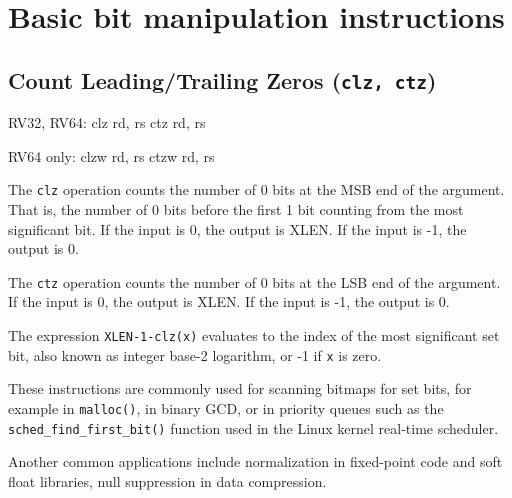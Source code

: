 
\section{Basic bit manipulation instructions}


\subsection{Count Leading/Trailing Zeros (\texttt{clz, ctz})}

\begin{rvb}
  RV32, RV64:
    clz rd, rs
    ctz rd, rs

  RV64 only:
    clzw rd, rs
    ctzw rd, rs
\end{rvb}

The {\tt clz} operation counts the number of 0 bits at the MSB end of the
argument.  That is, the number of 0 bits before the first 1 bit counting from
the most significant bit. If the input is 0, the output is XLEN. If the input
is -1, the output is 0.

The {\tt ctz} operation counts the number of 0 bits at the LSB end of the
argument. If the input is 0, the output is XLEN. If the input is -1, the
output is 0.



The expression {\tt XLEN-1-clz(x)} evaluates to the index of the most significant
set bit, also known as integer base-2 logarithm, or -1 if {\tt x} is zero.

These instructions are commonly used for scanning bitmaps for set bits, for
example in {\tt malloc()}, in binary GCD, or in priority queues such as the
{\tt sched\_find\_first\_bit()} function used in the Linux kernel real-time
scheduler.

Another common applications include normalization in fixed-point code and soft
float libraries, null suppression in data compression.

%
%

